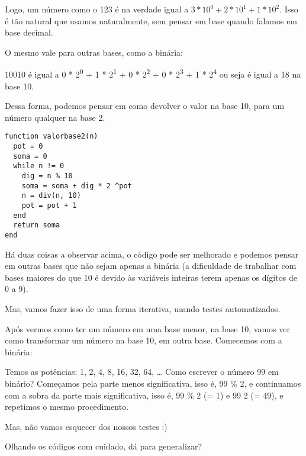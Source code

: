 \documentclass[a4paper]{article}
\begin{document}
Logo, um número como o 123 é na verdade igual a $3 * 10^0 + 2 * 10^1 + 1*10^2$.
Isso é tão natural que usamos naturalmente, sem pensar em base quando
falamos em base decimal.

O mesmo vale para outras bases, como a binária:

10010 é igual a 0 * 2\textsuperscript{0} + 1 * 2\textsuperscript{1} + 0 * 2\textsuperscript{2} + 0 * 2\textsuperscript{3} + 1 * 2\textsuperscript{4} ou seja é
igual a 18 na base 10.

Dessa forma, podemos pensar em como devolver o valor na
base 10, para um número qualquer na base 2.

\lstset{language=ein-julia,label= ,caption= ,captionpos=b,numbers=none}
\begin{lstlisting}
function valorbase2(n)
  pot = 0
  soma = 0
  while n != 0
    dig = n % 10
    soma = soma + dig * 2 ^pot
    n = div(n, 10)
    pot = pot + 1
  end
  return soma
end
\end{lstlisting}

Há duas coisas a observar acima, o código pode ser melhorado e
podemos pensar em outras bases que não sejam apenas a binária (a
dificuldade de trabalhar com bases maiores do que 10 é devido
às variáveis inteiras terem apenas os dígitos de 0 a 9).

Mas, vamos fazer isso de uma forma iterativa, usando testes
 automatizados.

Após vermos como ter um número em uma base menor, na base 10,
vamos ver como transformar um número na base 10, em outra base.
Comecemos com a binária:

Temos as potências: 1, 2, 4, 8, 16, 32, 64, \ldots{}
Como escrever o número 99 em binário?
Começamos pela parte menos significativa, isso é, 99 \% 2, e continuamos
com a sobra da parte mais significativa, isso é, 99 \% 2 (= 1) e
 99 \textdiv{} 2 (= 49), e repetimos o mesmo procedimento.

Mas, não vamos esquecer dos nossos testes :)

Olhando os códigos com cuidado, dá para generalizar?
\newpage
\end{document}
